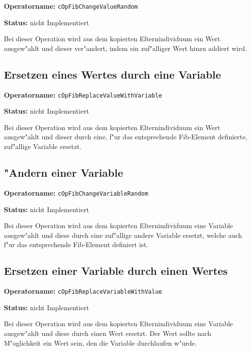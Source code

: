 \textbf{Operatorname:} \verb|cOpFibChangeValueRandom|

\bigskip\noindent
\textbf{Status:} nicht Implementiert

\bigskip\noindent
Bei dieser Operation wird aus dem kopierten Elternindividuum ein Wert ausgew"ahlt und dieser ver"andert, indem ein zuf"alliger Wert hinzu addiert wird.


\subsection{Ersetzen eines Wertes durch eine Variable}

\textbf{Operatorname:} \verb|cOpFibReplaceValueWithVariable|

\bigskip\noindent
\textbf{Status:} nicht Implementiert

\bigskip\noindent
Bei dieser Operation wird aus dem kopierten Elternindividuum ein Wert ausgew"ahlt und dieser durch eine, f"ur das entsprechende Fib-Element definierte, zuf"allige Variable ersetzt.


\subsection{"Andern einer Variable}

\textbf{Operatorname:} \verb|cOpFibChangeVariableRandom|

\bigskip\noindent
\textbf{Status:} nicht Implementiert

\bigskip\noindent
Bei dieser Operation wird aus dem kopierten Elternindividuum eine Variable ausgew"ahlt und diese durch eine zuf"allige andere Variable ersetzt, welche auch f"ur das entsprechende Fib-Element definiert ist.


\subsection{Ersetzen einer Variable durch einen Wertes}

\textbf{Operatorname:} \verb|cOpFibReplaceVariableWithValue|

\bigskip\noindent
\textbf{Status:} nicht Implementiert

\bigskip\noindent
Bei dieser Operation wird aus dem kopierten Elternindividuum eine Variable ausgew"ahlt und diese durch einen Wert ersetzt. Der Wert sollte nach M"oglichkeit ein Wert sein, den die Variable durchlaufen w"urde.


